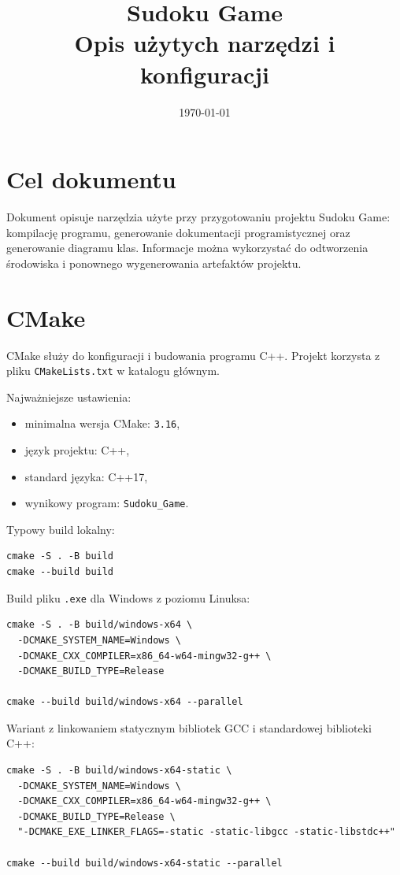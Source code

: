 \documentclass[12pt,a4paper]{article}
\title{Sudoku Game\\Opis użytych narzędzi i konfiguracji}
\author{}
\date{\today}
\begin{document}
\maketitle
\tableofcontents
\newpage

\section{Cel dokumentu}

Dokument opisuje narzędzia użyte przy przygotowaniu projektu Sudoku Game:
kompilację programu, generowanie dokumentacji programistycznej oraz generowanie
diagramu klas. Informacje można wykorzystać do odtworzenia środowiska i
ponownego wygenerowania artefaktów projektu.

\section{CMake}

CMake służy do konfiguracji i budowania programu C++.
Projekt korzysta z pliku \texttt{CMakeLists.txt} w katalogu głównym.

Najważniejsze ustawienia:
\begin{itemize}[noitemsep]
    \item minimalna wersja CMake: \texttt{3.16},
    \item język projektu: C++,
    \item standard języka: C++17,
    \item wynikowy program: \texttt{Sudoku\_Game}.
\end{itemize}

Typowy build lokalny:

\begin{lstlisting}
cmake -S . -B build
cmake --build build
\end{lstlisting}

Build pliku \texttt{.exe} dla Windows z poziomu Linuksa:

\begin{lstlisting}
cmake -S . -B build/windows-x64 \
  -DCMAKE_SYSTEM_NAME=Windows \
  -DCMAKE_CXX_COMPILER=x86_64-w64-mingw32-g++ \
  -DCMAKE_BUILD_TYPE=Release

cmake --build build/windows-x64 --parallel
\end{lstlisting}

Wariant z linkowaniem statycznym bibliotek GCC i standardowej biblioteki C++:

\begin{lstlisting}
cmake -S . -B build/windows-x64-static \
  -DCMAKE_SYSTEM_NAME=Windows \
  -DCMAKE_CXX_COMPILER=x86_64-w64-mingw32-g++ \
  -DCMAKE_BUILD_TYPE=Release \
  "-DCMAKE_EXE_LINKER_FLAGS=-static -static-libgcc -static-libstdc++"

cmake --build build/windows-x64-static --parallel
\end{lstlisting}
\end{document}
